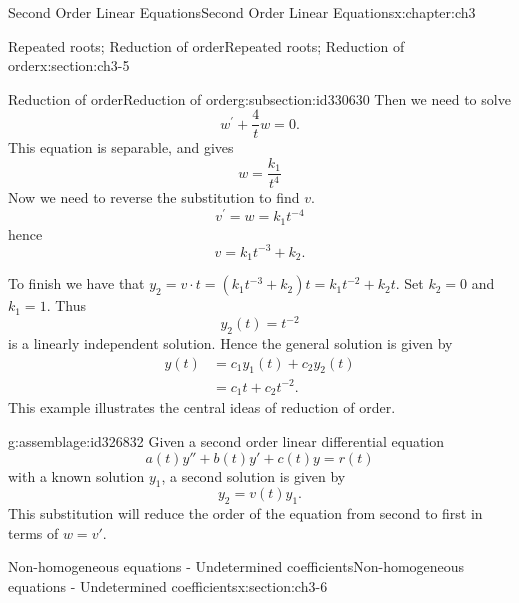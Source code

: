 \documentclass[oneside,10pt,]{book}
\numberwithin{equation}{section}
\numberwithin{equation}{section}
\newcommand{\amp}{&}
\begin{document}
\begin{chapterptx}{Second Order Linear Equations}{}{Second Order Linear Equations}{}{}{x:chapter:ch3}
\begin{sectionptx}{Repeated roots; Reduction of order}{}{Repeated roots; Reduction of order}{}{}{x:section:ch3-5}
\begin{subsectionptx}{Reduction of order}{}{Reduction of order}{}{}{g:subsection:id330630}
 Then we need to solve%
\begin{equation*}
w^{\prime}+\frac{4}{t}w=0.
\end{equation*}
This equation is separable, and gives%
\begin{equation*}
w = \frac{k_{1}}{t^{4}}
\end{equation*}
Now we need to reverse the substitution to find \(v\).%
\begin{equation*}
v^{\prime}=w=k_{1}t^{-4}
\end{equation*}
hence%
\begin{equation*}
v=k_{1}t^{-3}+k_{2}.
\end{equation*}
%
\par
To finish we have that \(y_{2}=v\cdot t=\left(k_{1}t^{-3}+k_{2}\right)t=k_{1}t^{-2}+k_{2}t\). Set \(k_{2}=0\) and \(k_{1}=1\). Thus%
\begin{equation*}
y_{2}(t)=t^{-2}
\end{equation*}
is a linearly independent solution. Hence the general solution is given by%
\begin{align*}
y(t) \amp =c_{1}y_{1}(t)+c_{2}y_{2}(t)\\
\amp =c_{1}t+c_{2}t^{-2}.
\end{align*}
%
 This example illustrates the central ideas of reduction of order. \begin{assemblage}{}{g:assemblage:id326832}%
Given a second order linear differential equation%
\begin{equation*}
a(t) y'' + b(t) y' + c(t) y = r(t)
\end{equation*}
with a known solution \(y_1\), a second solution is given by%
\begin{equation*}
y_2 = v(t)y_1.
\end{equation*}
This substitution will reduce the order of the equation from second to first in terms of \(w = v'\).%
\end{assemblage}
\end{subsectionptx}
\end{sectionptx}
%
%
\typeout{************************************************}
\typeout{************************************************}
%
\begin{sectionptx}{Non-homogeneous equations - Undetermined coefficients}{}{Non-homogeneous equations - Undetermined coefficients}{}{}{x:section:ch3-6}
%
%
\typeout{************************************************}

\end{sectionptx}
\end{chapterptx}
\end{document}
